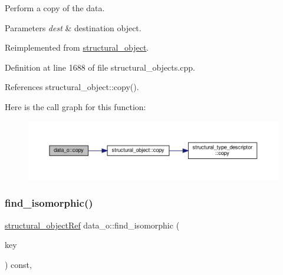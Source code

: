 Perform a copy of the data. 


\begin{DoxyParams}{Parameters}
{\em dest} & destination object. \\
\hline
\end{DoxyParams}


Reimplemented from \hyperlink{classstructural__object_a6566435c67934f6b4ff1b319c0682b18}{structural\+\_\+object}.



Definition at line 1688 of file structural\+\_\+objects.\+cpp.



References structural\+\_\+object\+::copy().

Here is the call graph for this function\+:
\nopagebreak
\begin{figure}[H]
\begin{center}
\leavevmode
\includegraphics[width=350pt]{d5/d34/classdata__o_a63d272f750a9374710c1bc8a8d06e83c_cgraph}
\end{center}
\end{figure}
\mbox{\label{classdata__o_a6e9d672d84085462c777887ab7c57763}} 
\subsubsection{\texorpdfstring{find\+\_\+isomorphic()}{find\_isomorphic()}}
{\footnotesize\ttfamily \hyperlink{structural__objects_8hpp_a8ea5f8cc50ab8f4c31e2751074ff60b2}{structural\+\_\+object\+Ref} data\+\_\+o\+::find\+\_\+isomorphic (\begin{DoxyParamCaption}\item[{const \hyperlink{structural__objects_8hpp_a8ea5f8cc50ab8f4c31e2751074ff60b2}{structural\+\_\+object\+Ref}}]{key }\end{DoxyParamCaption}) const\hspace{0.3cm}{\ttfamily [override]}, {\ttfamily [virtual]}}



